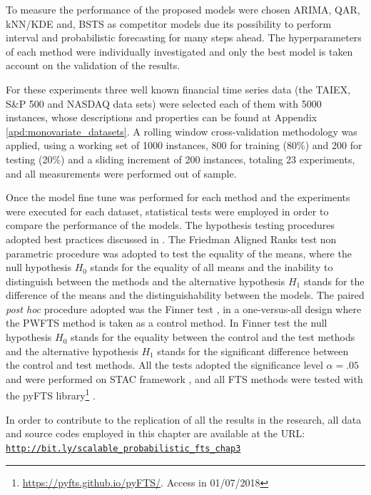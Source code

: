 To measure the performance of the proposed models were chosen ARIMA, QAR, kNN/KDE and, BSTS as competitor models due its possibility to perform interval and probabilistic forecasting for many steps ahead. The hyperparameters of each method were individually investigated and only the best model is taken account on the validation of the results.

For these experiments three well known financial time series data (the TAIEX, S\&P 500 and NASDAQ data sets) were selected each of them with 5000 instances, whose descriptions and properties can be found at Appendix \ref{apd:monovariate_datasets}. A rolling window cross-validation methodology \cite{Tashman2000} was applied, using a working set of 1000 instances, 800 for training (80\%) and 200 for testing (20\%) and a sliding increment of 200 instances, totaling 23 experiments, and all measurements were performed out of sample.

Once the model fine tune was performed for each method and the experiments were executed for each dataset, statistical tests were employed in order to compare the performance of the models. The hypothesis testing procedures adopted best practices discussed in \cite{Garcia2010,Derrac2011,Trawinski2012}. The Friedman Aligned Ranks test \cite{friedmanalignedrankstest} non parametric procedure was adopted to test the equality of the means, where the null hypothesis $H_0$ stands for the equality of all means and the inability to distinguish between the methods and the alternative hypothesis $H_1$ stands for the difference of the means and the distinguishability between the models. The paired \textit{post hoc} procedure adopted was the Finner test \cite{finnertest}, in a one-versus-all design where the PWFTS method is taken as a control method. In Finner test  the null hypothesis $H_0$ stands for the equality between the control and the test methods and the alternative hypothesis $H_1$ stands for the significant difference between the control and test methods. All the tests adopted the significance level $\alpha = .05$ and were performed on STAC framework \cite{stac}, and all FTS methods were tested with the pyFTS library\footnote{\url{https://pyfts.github.io/pyFTS/}. Access in 01/07/2018} \cite{pyFTS}. 

In order to contribute to the replication of all the results in the research, all data and source codes employed in this chapter are available at the URL:
\texttt{\url{http://bit.ly/scalable_probabilistic_fts_chap3}}

%
